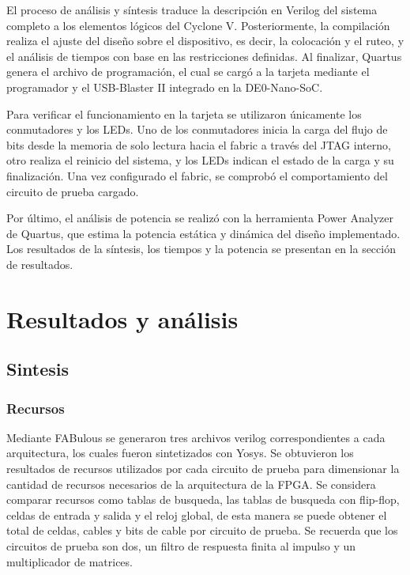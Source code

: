 El proceso de análisis y síntesis traduce la descripción en Verilog del sistema completo a los elementos lógicos del Cyclone V. Posteriormente, la compilación realiza el ajuste del diseño sobre el dispositivo, es decir, la colocación y el ruteo, y el análisis de tiempos con base en las restricciones definidas. Al finalizar, Quartus\textregistered{} genera el archivo de programación, el cual se cargó a la tarjeta mediante el programador y el USB-Blaster II integrado en la DE0-Nano-SoC.

Para verificar el funcionamiento en la tarjeta se utilizaron únicamente los conmutadores y los LEDs. Uno de los conmutadores inicia la carga del flujo de bits desde la memoria de solo lectura hacia el fabric a través del JTAG interno, otro realiza el reinicio del sistema, y los LEDs indican el estado de la carga y su finalización. Una vez configurado el fabric, se comprobó el comportamiento del circuito de prueba cargado.

Por último, el análisis de potencia se realizó con la herramienta Power Analyzer de Quartus\textregistered{}, que estima la potencia estática y dinámica del diseño implementado. Los resultados de la síntesis, los tiempos y la potencia se presentan en la sección de resultados.

\chapter{Resultados y análisis}
\label{ch:rd}

\section{Sintesis}

\subsection{Recursos}

Mediante FABulous se generaron tres archivos verilog correspondientes a cada arquitectura, los cuales fueron sintetizados con Yosys. Se obtuvieron los resultados de recursos utilizados por cada circuito de prueba para dimensionar la cantidad de recursos necesarios de la arquitectura de la FPGA. Se considera comparar recursos como tablas de busqueda, las tablas de busqueda con flip-flop, celdas de entrada y salida y el reloj global, de esta manera se puede obtener el total de celdas, cables y bits de cable por circuito de prueba. Se recuerda que los circuitos de prueba son dos, un filtro de respuesta finita al impulso y un multiplicador de matrices.


